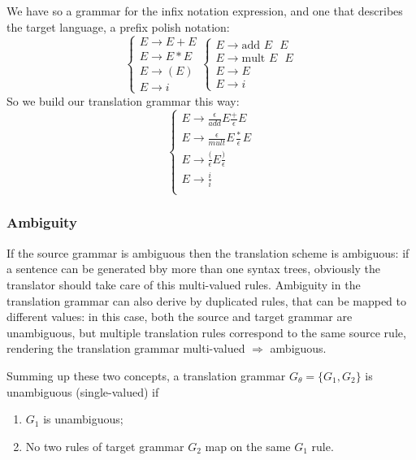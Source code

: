 			We have so a grammar for the infix notation expression, and one that describes the target language, a prefix polish notation:
			\begin{equation}
				\begin{cases}
					E \rightarrow E + E \\
					E \rightarrow E * E \\
					E \rightarrow ( E ) \\
					E \rightarrow i
				\end{cases} 
				\begin{cases}
					E \rightarrow \text{add } E \text{ } E \\
					E \rightarrow \text{mult } E \text{ } E \\
					E \rightarrow E  \\
					E \rightarrow i
				\end{cases}
			\end{equation}
			So we build our translation grammar this way:
			\begin{equation}
				\begin{cases}
					E \rightarrow \frac{\epsilon}{add} E \frac{+}{\epsilon} E \\
					E \rightarrow \frac{\epsilon}{mult} E \frac{*}{\epsilon} E \\
					E \rightarrow \frac{(}{\epsilon} E \frac{)}{\epsilon} \\
					E \rightarrow \frac{i}{i} \\
				\end{cases}
			\end{equation}
			
			\subsubsection{Ambiguity}
				If the source grammar is ambiguous then the translation scheme is ambiguous: if a sentence can be generated bby more than one syntax trees, 
				obviously the translator should take care of this multi-valued rules. Ambiguity in the translation grammar can also derive by duplicated rules, 
				that can be mapped to different values: in this case, both the source and target grammar are unambiguous, but multiple translation rules correspond 
				to the same source rule, rendering the translation grammar multi-valued $\Rightarrow$ ambiguous.

				Summing up these two concepts, a translation grammar $ G_\theta = \{ G_1 , G_2\}$ is unambiguous (single-valued) if 
				\begin{enumerate}
					\item $G_1$ is unambiguous;
					\item No two rules of target grammar $G_2$ map on the same $G_1$ rule.
				\end{enumerate}
		
